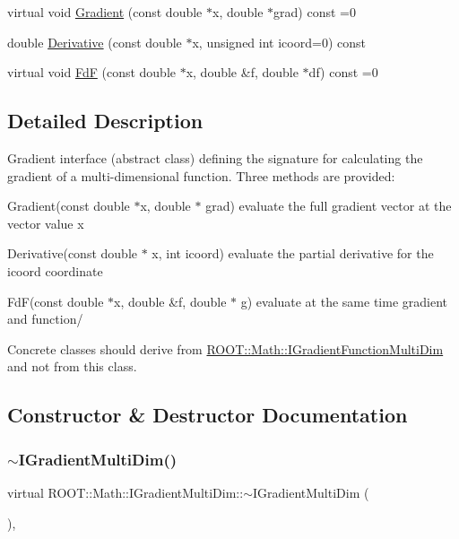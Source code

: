 \begin{DoxyCompactItemize}
virtual void \mbox{\hyperlink{classROOT_1_1Math_1_1IGradientMultiDim_ac5785e2df4fa36061bf9ddbb9ce4dde0}{Gradient}} (const double $\ast$x, double $\ast$grad) const =0
\item 
double \mbox{\hyperlink{classROOT_1_1Math_1_1IGradientMultiDim_ae131d6cc942c8fcf90a3b575335b30a7}{Derivative}} (const double $\ast$x, unsigned int icoord=0) const
\item 
virtual void \mbox{\hyperlink{classROOT_1_1Math_1_1IGradientMultiDim_ad8d0e31b786327014524483a708d8f82}{FdF}} (const double $\ast$x, double \&f, double $\ast$df) const =0
\end{DoxyCompactItemize}


\subsection{Detailed Description}
Gradient interface (abstract class) defining the signature for calculating the gradient of a multi-\/dimensional function. Three methods are provided\+:
\begin{DoxyItemize}
\item Gradient(const double $\ast$x, double $\ast$ grad) evaluate the full gradient vector at the vector value x
\item Derivative(const double $\ast$ x, int icoord) evaluate the partial derivative for the icoord coordinate
\item Fd\+F(const double $\ast$x, double \&f, double $\ast$ g) evaluate at the same time gradient and function/
\end{DoxyItemize}

Concrete classes should derive from \mbox{\hyperlink{classROOT_1_1Math_1_1IGradientFunctionMultiDim}{R\+O\+O\+T\+::\+Math\+::\+I\+Gradient\+Function\+Multi\+Dim}} and not from this class. 

\subsection{Constructor \& Destructor Documentation}
\mbox{\label{classROOT_1_1Math_1_1IGradientMultiDim_a68ce0f439481e78992945f7d8b8fb42e}} 
\subsubsection{\texorpdfstring{$\sim$IGradientMultiDim()}{~IGradientMultiDim()}\hspace{0.1cm}{\footnotesize\ttfamily [1/3]}}
{\footnotesize\ttfamily virtual R\+O\+O\+T\+::\+Math\+::\+I\+Gradient\+Multi\+Dim\+::$\sim$\+I\+Gradient\+Multi\+Dim (\begin{DoxyParamCaption}{ }\end{DoxyParamCaption})\hspace{0.3cm}{\ttfamily [inline]}, {\ttfamily [virtual]}}



